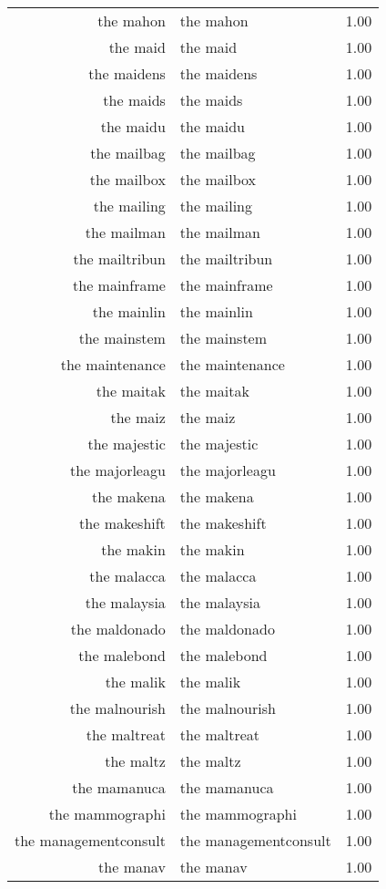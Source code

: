 \begin{table}[ht]
\begin{tabular}{rlr}
  the mahon & the mahon & 1.00 \\ 
  the maid & the maid & 1.00 \\ 
  the maidens & the maidens & 1.00 \\ 
  the maids & the maids & 1.00 \\ 
  the maidu & the maidu & 1.00 \\ 
  the mailbag & the mailbag & 1.00 \\ 
  the mailbox & the mailbox & 1.00 \\ 
  the mailing & the mailing & 1.00 \\ 
  the mailman & the mailman & 1.00 \\ 
  the mailtribun & the mailtribun & 1.00 \\ 
  the mainframe & the mainframe & 1.00 \\ 
  the mainlin & the mainlin & 1.00 \\ 
  the mainstem & the mainstem & 1.00 \\ 
  the maintenance & the maintenance & 1.00 \\ 
  the maitak & the maitak & 1.00 \\ 
  the maiz & the maiz & 1.00 \\ 
  the majestic & the majestic & 1.00 \\ 
  the majorleagu & the majorleagu & 1.00 \\ 
  the makena & the makena & 1.00 \\ 
  the makeshift & the makeshift & 1.00 \\ 
  the makin & the makin & 1.00 \\ 
  the malacca & the malacca & 1.00 \\ 
  the malaysia & the malaysia & 1.00 \\ 
  the maldonado & the maldonado & 1.00 \\ 
  the malebond & the malebond & 1.00 \\ 
  the malik & the malik & 1.00 \\ 
  the malnourish & the malnourish & 1.00 \\ 
  the maltreat & the maltreat & 1.00 \\ 
  the maltz & the maltz & 1.00 \\ 
  the mamanuca & the mamanuca & 1.00 \\ 
  the mammographi & the mammographi & 1.00 \\ 
  the managementconsult & the managementconsult & 1.00 \\ 
  the manav & the manav & 1.00 \\ 

\end{tabular}
\end{table}

